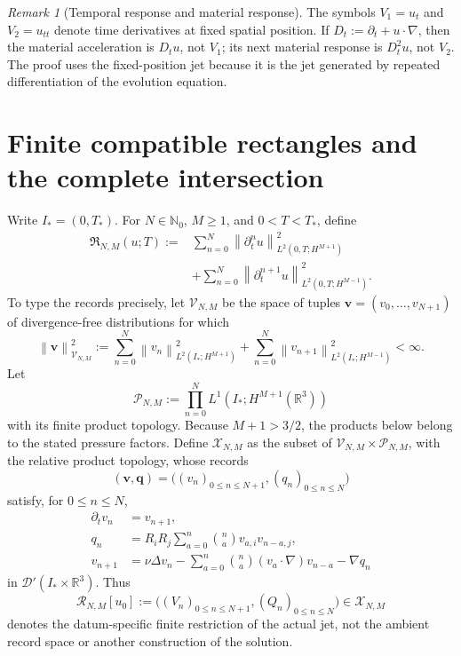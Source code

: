 \documentclass[11pt,letterpaper]{article}
\theoremstyle{definition}
\theoremstyle{remark}
\newtheorem{remark}[theorem]{Remark}
\newcommand{\R}{\mathbb R}
\newcommand{\Nzero}{\mathbb N_0}
\newcommand{\cR}{\mathcal R}
\newcommand{\frakR}{\mathfrak R}
\newcommand{\norm}[1]{\left\lVert #1\right\rVert}
\newcommand{\Istar}{I_*}
\begin{document}
\begin{remark}[Temporal response and material response]
The symbols \(V_1=u_t\) and \(V_2=u_{tt}\) denote time derivatives at fixed
spatial position.  If \(D_t:=\partial_t+u\cdot\nabla\), then the material
acceleration is \(D_tu\), not \(V_1\); its next material response is
\(D_t^2u\), not \(V_2\).  The proof uses the fixed-position jet because it
is the jet generated by repeated differentiation of the evolution equation.
\end{remark}

\section{Finite compatible rectangles and the complete intersection}

Write \(\Istar=(0,T_*)\).  For \(N\in\Nzero\), \(M\ge1\), and
\(0<T<T_*\), define
\begin{equation}
\begin{aligned}
\frakR_{N,M}(u;T)
:={}&\sum_{n=0}^{N}
\norm{\partial_t^n u}_{L^2(0,T;H^{M+1})}^2 \\
&+\sum_{n=0}^{N}
\norm{\partial_t^{n+1}u}_{L^2(0,T;H^{M-1})}^2.
\end{aligned}
\label{eq:rectangle-norm}
\end{equation}
To type the records precisely, let \(\mathscr V_{N,M}\) be the space of
tuples \(\mathbf v=(v_0,\ldots,v_{N+1})\) of divergence-free distributions
for which
\begin{equation}
\norm{\mathbf v}_{\mathscr V_{N,M}}^2
:=\sum_{n=0}^{N}\norm{v_n}_{L^2(\Istar;H^{M+1})}^2
+\sum_{n=0}^{N}\norm{v_{n+1}}_{L^2(\Istar;H^{M-1})}^2
<\infty.
\label{eq:velocity-record-space}
\end{equation}
Let
\[
\mathscr P_{N,M}
:=\prod_{n=0}^{N}L^1(\Istar;H^{M+1}(\R^3))
\]
with its finite product topology.  Because \(M+1>3/2\), the products below
belong to the stated pressure factors.  Define \(\mathscr X_{N,M}\) as the
subset of \(\mathscr V_{N,M}\times\mathscr P_{N,M}\), with the relative
product topology, whose records
\[
(\mathbf v,\mathbf q)
=\bigl((v_n)_{0\le n\le N+1},(q_n)_{0\le n\le N}\bigr)
\]
satisfy, for \(0\le n\le N\),
\begin{align}
\partial_t v_n&=v_{n+1},
\label{eq:record-time-link}\\
q_n&=R_iR_j\sum_{a=0}^{n}\binom{n}{a}v_{a,i}v_{n-a,j},
\label{eq:record-pressure-link}\\
v_{n+1}
&=\nu\Delta v_n
-\sum_{a=0}^{n}\binom{n}{a}(v_a\cdot\nabla)v_{n-a}
-\nabla q_n
\label{eq:record-equation-link}
\end{align}
in \(\mathcal D'(\Istar\times\R^3)\).  Thus
\[
\cR_{N,M}[u_0]
:=\bigl((V_n)_{0\le n\le N+1},(Q_n)_{0\le n\le N}\bigr)
\in\mathscr X_{N,M}
\]
denotes the datum-specific finite restriction of the actual jet, not the
ambient record space or another construction of the solution.
\end{document}
